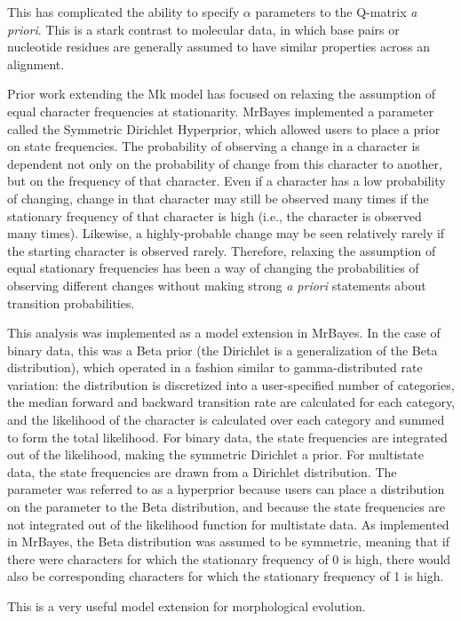 \documentclass[]{article}
\begin{document}
	This has complicated the ability to specify $\alpha$ parameters to the Q-matrix \textit{a priori}.
	This is a stark contrast to molecular data, in which base pairs or nucleotide residues are generally assumed to have similar properties across an alignment. \par
Prior work extending the Mk model has focused on relaxing the assumption of equal character frequencies at stationarity.
MrBayes implemented a parameter called the Symmetric Dirichlet Hyperprior, which allowed users to place a prior on state frequencies. 
The probability of observing a change in a character is dependent not only on the probability of change from this character to another, but on the frequency of that character.
Even if a character has a low probability of changing, change in that character may still be observed many times if the stationary frequency of that character is high (i.e., the character is observed many times). 
Likewise, a highly-probable change may be seen relatively rarely if the starting character is observed rarely. 
Therefore, relaxing the assumption of equal stationary frequencies has been a way of changing the probabilities of observing different changes without making strong \textit{a priori} statements about transition probabilities. \par
This analysis was implemented as a model extension in MrBayes.
In the case of binary data, this was a Beta prior (the Dirichlet is a generalization of the Beta distribution), which operated in a fashion similar to gamma-distributed rate variation: the distribution is discretized into a user-specified number of categories, the median forward and backward transition rate are calculated for each category, and the likelihood of the character is calculated over each category and summed to form the total likelihood. 
For binary data, the state frequencies are integrated out of the likelihood, making the symmetric Dirichlet a prior.
For multistate data, the state frequencies are drawn from a Dirichlet distribution.
The parameter was referred to as a hyperprior because users can place a distribution on the parameter to the Beta distribution, and because the state frequencies are not integrated out of the likelihood function for multistate data. 
As implemented in MrBayes, the Beta distribution was assumed to be symmetric, meaning that if there were characters for which the stationary frequency of 0 is high, there would also be corresponding characters for which the stationary frequency of 1 is high.\par
This is a very useful model extension for morphological evolution.
\end{document}
